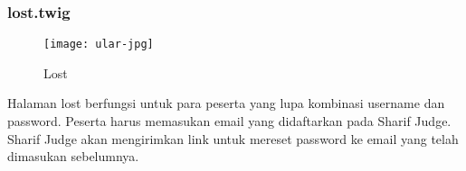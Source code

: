 \subsubsection{lost.twig}
\begin{figure}[H]
	\centering  
	\texttt{[image: ular-jpg]}  
	\caption[Lost]{Lost} 
	\label{fig:lost} 
\end{figure} 
Halaman lost berfungsi untuk para peserta yang lupa kombinasi username dan password. Peserta harus memasukan email yang didaftarkan pada Sharif Judge. Sharif Judge akan mengirimkan link untuk mereset password ke email yang telah dimasukan sebelumnya.